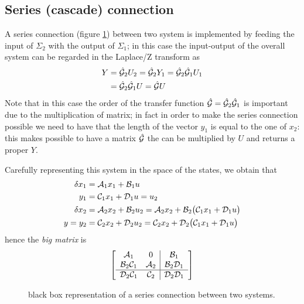 	\subsection[Series connection]{Series (cascade) connection}
		A series connection (figure \ref{fig:dyn:series}) between two system is implemented by feeding the input of $\Sigma_2$ with the output of $\Sigma_1$; in this case the input-output of the overall system can be regarded in the Laplace/Z transform as
		\begin{equation}
		\begin{aligned}
			Y & = \hat {\mathcal{G}}_2 U_2 = \hat {\mathcal{G}}_2 Y_1 = \hat {\mathcal{G}}_2 \hat {\mathcal{G}}_1 U_1 \\ & = \hat {\mathcal{G}}_2 \hat {\mathcal{G}}_1  U = \hat {\mathcal{G}} U
		\end{aligned}
		\end{equation}
		Note that in this case the order of the transfer function $\hat {\mathcal{G}}= \hat {\mathcal{G}}_2 \hat {\mathcal{G}}_1$ is important due to the multiplication of matrix; in fact in order to make the series connection possible we need to have that the length of the vector $y_1$ is equal to the one of $x_2$: this makes possible to have a matrix $\hat {\mathcal{G}}$ the can be multiplied by $U$ and returns a proper $Y$.
	
		Carefully representing this system in the space of the states, we obtain that
		\begin{align*}
			\delta x_1 & = \mathcal{A}_1 x_1 + \mathcal{B}_1 u \\
			y_1 & = \mathcal{C}_1 x_1 + \mathcal{D}_1 u = u_2 \\
			\delta x_2 & = \mathcal{A}_2 x_2 + \mathcal{B}_2 u_2 = \mathcal{A}_2 x_2 + \mathcal{B}_2\big( \mathcal{C}_1 x_1 + \mathcal{D}_1 u \big) \\
			y= y_2 & = \mathcal{C}_2 x_2 + \mathcal{D}_2 u_2 = \mathcal{C}_2 x_2 + \mathcal{D}_2 \big(\mathcal{C}_1 x_1 + \mathcal{D}_1 u\big)
		\end{align*}
		hence the \textit{big matrix} is
		\begin{equation}
			\begin{bmatrix}  \begin{array} {c c | c}
					\mathcal{A}_1 & 0 & \mathcal{B}_1 \\ 
					\mathcal{B}_2 \mathcal{C}_1 & \mathcal{A}_2 & \mathcal{B}_2 \mathcal{D}_1 \\ \hline 
					\mathcal{D}_2 \mathcal{C}_1 & \mathcal{C}_2 & \mathcal{D}_2\mathcal{D}_1
			\end{array}  \end{bmatrix}
		\end{equation}
		
		\begin{figure}[bht]
			\centering
			\caption{black box representation of a series connection between two systems.} \label{fig:dyn:series}
		\end{figure}
	
